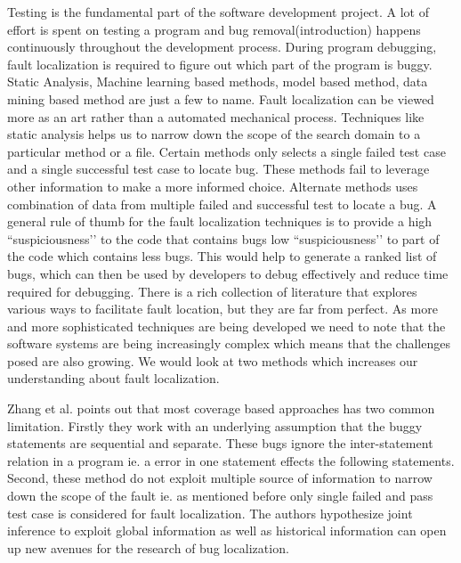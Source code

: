 \documentclass[10pt, conference, compsocconf]{IEEEtran}
\begin{document}
Testing is the fundamental part of the software development project. A lot of effort is spent on testing a program and bug removal(introduction) happens continuously throughout the development process. During program debugging, fault localization is required to figure out which part of the program is buggy. Static Analysis, Machine learning based methods, model based method, data mining based method are just a few to name. Fault localization can be viewed more as an art rather than a automated mechanical process. Techniques like static analysis helps us to narrow down the scope of the search domain to a particular method or a file. Certain methods \cite{guo2006accurately}\cite{zeller2002isolating} only selects a single failed test case and a single successful test case to locate bug. These methods fail to leverage other information to make a more informed choice. Alternate methods \cite{liblit2005scalable}\cite{liu2006statistical} uses combination of data from multiple failed and successful test to locate a bug.  A general rule of thumb for the fault localization techniques is to provide a high ``suspiciousness’’ to the code that contains bugs low ``suspiciousness’’ to part of the code which contains less bugs. This would help to generate a ranked list of bugs, which can then be used by developers to debug effectively and reduce time required for debugging. There is a rich collection of literature that explores various ways to facilitate fault location, but they are far from perfect. As more and more sophisticated techniques are being developed we need to note that the software systems are being increasingly complex which means that the challenges posed are also growing. We would look at two methods which increases our understanding about fault localization.

Zhang et al. points out that most coverage based approaches has two common limitation. Firstly they work with an underlying assumption that the buggy statements are sequential and separate. These bugs ignore the inter-statement relation in a program ie. a error in one statement  effects the following statements. Second, these method do not exploit multiple source of information to narrow down the scope of the fault ie. as mentioned before only single failed and pass test case is considered for fault localization. The authors hypothesize joint inference to exploit global information as well as historical information can open up new avenues for the research of bug localization.
\end{document}
